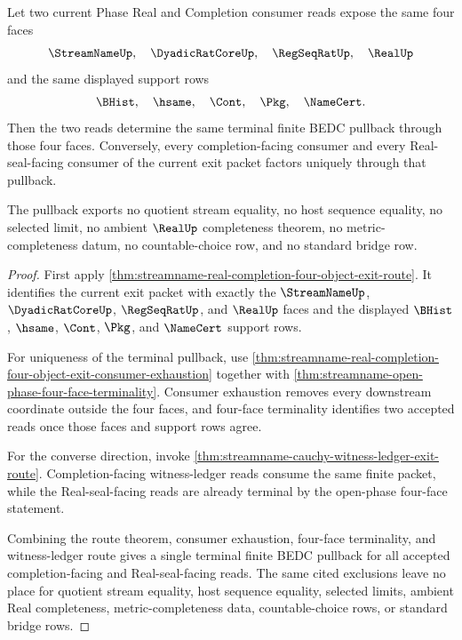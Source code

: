\begin{theorem}
\label{thm:streamname-real-completion-four-object-terminal-pullback}
Let two current Phase Real and Completion consumer reads expose the same four faces
$$
\StreamNameUp,\quad \DyadicRatCoreUp,\quad \RegSeqRatUp,\quad \RealUp
$$
and the same displayed support rows
$$
\BHist,\quad \hsame,\quad \Cont,\quad \Pkg,\quad \NameCert.
$$
Then the two reads determine the same terminal finite BEDC pullback through those four faces. Conversely, every completion-facing consumer and every Real-seal-facing consumer of the current exit packet factors uniquely through that pullback.

The pullback exports no quotient stream equality, no host sequence equality, no selected limit, no ambient $\RealUp$ completeness theorem, no metric-completeness datum, no countable-choice row, and no standard bridge row.
\end{theorem}
\begin{proof}
First apply \autoref{thm:streamname-real-completion-four-object-exit-route}. It identifies the current exit packet with exactly the $\StreamNameUp$, $\DyadicRatCoreUp$, $\RegSeqRatUp$, and $\RealUp$ faces and the displayed $\BHist$, $\hsame$, $\Cont$, $\Pkg$, and $\NameCert$ support rows.

For uniqueness of the terminal pullback, use \autoref{thm:streamname-real-completion-four-object-exit-consumer-exhaustion} together with \autoref{thm:streamname-open-phase-four-face-terminality}. Consumer exhaustion removes every downstream coordinate outside the four faces, and four-face terminality identifies two accepted reads once those faces and support rows agree.

For the converse direction, invoke \autoref{thm:streamname-cauchy-witness-ledger-exit-route}. Completion-facing witness-ledger reads consume the same finite packet, while the Real-seal-facing reads are already terminal by the open-phase four-face statement.

Combining the route theorem, consumer exhaustion, four-face terminality, and witness-ledger route gives a single terminal finite BEDC pullback for all accepted completion-facing and Real-seal-facing reads. The same cited exclusions leave no place for quotient stream equality, host sequence equality, selected limits, ambient Real completeness, metric-completeness data, countable-choice rows, or standard bridge rows.
\end{proof}

